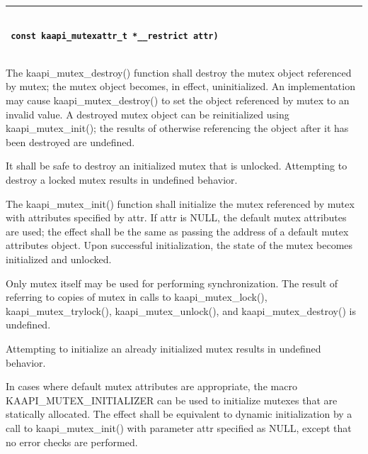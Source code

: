 

\begin{description}
\vspace*{3ex} \hrule width 4cm
\vspace*{3ex} 
\item [\texttt{int kaapi\_mutex\_init (kaapi\_mutex\_t *\_\_restrict mutex,}]~\\
\textbf{\texttt{ const kaapi\_mutexattr\_t *\_\_restrict attr)}}
\item [\texttt{int kaapi\_mutex\_destroy (kaapi\_mutex\_t *mutex)}]~\\

The kaapi\_mutex\_destroy() function shall destroy the mutex object referenced
by mutex; the mutex object becomes, in effect, uninitialized. An
implementation may cause kaapi\_mutex\_destroy() to set the object referenced
by mutex to an invalid value. A destroyed mutex object can be reinitialized
using kaapi\_mutex\_init(); the results of otherwise referencing the object
after it has been destroyed are undefined.

It shall be safe to destroy an initialized mutex that is unlocked. Attempting
to destroy a locked mutex results in undefined behavior.

The kaapi\_mutex\_init() function shall initialize the mutex referenced by
mutex with attributes specified by attr. If attr is NULL, the default mutex
attributes are used; the effect shall be the same as passing the address of a
default mutex attributes object. Upon successful initialization, the state of
the mutex becomes initialized and unlocked.

Only mutex itself may be used for performing synchronization. The result of
referring to copies of mutex in calls to kaapi\_mutex\_lock(),
kaapi\_mutex\_trylock(), kaapi\_mutex\_unlock(), and kaapi\_mutex\_destroy()
is undefined.

Attempting to initialize an already initialized mutex results in undefined
behavior.

In cases where default mutex attributes are appropriate, the macro
KAAPI\_MUTEX\_INITIALIZER can be used to initialize mutexes that are
statically allocated. The effect shall be equivalent to dynamic initialization
by a call to kaapi\_mutex\_init() with parameter attr specified as NULL,
except that no error checks are performed.


\end{description}
